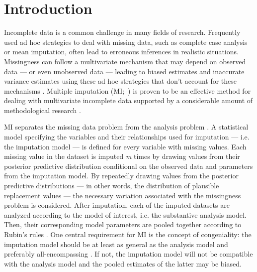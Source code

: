 \documentclass[3p,12pt,a4paper]{elsarticle}
\begin{document}
\newpage
\tableofcontents
\newpage
\section{Introduction}
Incomplete data is a common challenge in many fields of research. Frequently used ad hoc strategies to deal with missing data, such as complete case analysis or mean imputation, often lead to erroneous inferences in realistic situations. Missingness can follow a multivariate mechanism that may depend on observed data --- or even unobserved data --- leading to biased estimates and inaccurate variance estimates using these ad hoc strategies that don't account for these mechanisms \citep{buurenFlexibleImputationMissing2018, kang2013, enders2017, austin2021, little2002}. Multiple imputation (MI;~) is proven to be an effective method for dealing with multivariate incomplete data supported by a considerable amount of methodological research \citep{mistlerComparisonJointModel2017, buurenFlexibleImputationMissing2018, enders2017, burgette2010, austin2021, audigier2018, vanbuuren2007, grund2021, hughes2014, little2002}.

MI separates the missing data problem from the analysis problem \citep{mistlerComparisonJointModel2017, buurenFlexibleImputationMissing2018, enders2017, burgette2010, austin2021, audigier2018, vanbuuren2007, grund2021, hughes2014, little2002, carpenter2013, bartlett2015}. A statistical model specifying the variables and their relationships used for imputation --- i.e. the imputation model --- is defined for every variable with missing values. Each missing value in the dataset is imputed \textit{m} times by drawing values from their posterior predictive distribution conditional on the observed data and parameters from the imputation model. By repeatedly drawing values from the posterior predictive distributions --- in other words, the distribution of plausible replacement values --- the necessary variation associated with the missingness problem is considered. After imputation, each of the imputed datasets are analyzed according to the model of interest, i.e. the substantive analysis model. Then, their corresponding model parameters are pooled together according to Rubin's rules \citep{rubin1987}. 
One central requirement for MI is the concept of congeniality: the imputation model should be at least as general as the analysis model and preferably all-encompassing \citep{grund2018, enders2018, meng1994multiple, bartlett2015, grund2016, little2002}. If not, the imputation model will not be compatible with the analysis model and the pooled estimates of the latter may be biased. 
\end{document}
